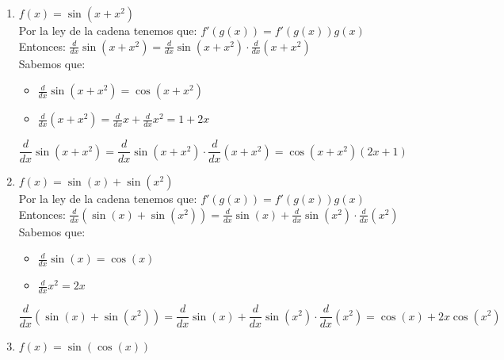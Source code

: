 \documentclass[12pt]{article}
\begin{document}
\begin{enumerate}[\hspace{9px} a)]
    \item \(f(x) = \sin(x+x^2)\)\\

        Por la ley de la cadena tenemos que: \(f'(g(x))=f'(g(x))g(x)\)\\

        Entonces: \quad \(\displaystyle\frac{d}{dx}\sin(x+x^2)=\displaystyle\frac{d}{dx}\sin(x+x^2)\cdot\displaystyle\frac{d}{dx}(x+x^2)\)\\

        Sabemos que:
        \begin{itemize}
            \item \(\displaystyle\frac{d}{dx}\sin(x+x^2)=\cos(x+x^2)\)
            \item \(\displaystyle\frac{d}{dx}(x+x^2)=\frac{d}{dx}x + \frac{d}{dx}x^2=1+2x\)
        \end{itemize}

        \[\displaystyle\frac{d}{dx}\sin(x+x^2)=\displaystyle\frac{d}{dx}\sin(x+x^2)\cdot\displaystyle\frac{d}{dx}(x+x^2)=\cos(x+x^2)(2x+1)\]
    \item \(f(x) = \sin(x) + \sin(x^2)\)\\

        Por la ley de la cadena tenemos que: \(f'(g(x))=f'(g(x))g(x)\)\\

        Entonces: \quad \(\displaystyle\frac{d}{dx}(\sin(x)+\sin(x^2))=\displaystyle\frac{d}{dx}\sin(x)+\frac{d}{dx}\sin(x^2)\cdot\frac{d}{dx}(x^2)\)\\

        Sabemos que:
        \begin{itemize}
            \item \(\displaystyle\frac{d}{dx}\sin(x)=\cos(x)\)
            \item \(\displaystyle\frac{d}{dx}x^2=2x\)
        \end{itemize}

        \begin{equation*}
            \displaystyle\frac{d}{dx}(\sin(x)+\sin(x^2))=\displaystyle\frac{d}{dx}\sin(x)+\frac{d}{dx}\sin(x^2)\cdot\frac{d}{dx}(x^2)=\cos(x)+2x\cos(x^2)
        \end{equation*}
    \item \(f(x) = \sin(\cos(x))\)\\


\end{enumerate}
\end{document}
